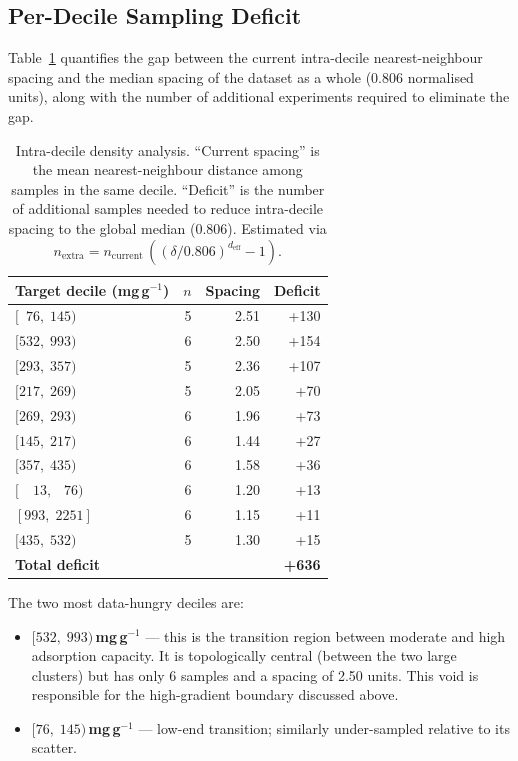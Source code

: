 \documentclass[12pt,a4paper]{article}
\begin{document}
\subsection{Per-Decile Sampling Deficit}

Table~\ref{tab:decile_deficit} quantifies the gap between the current
intra-decile nearest-neighbour spacing and the median spacing of the
dataset as a whole (0.806 normalised units), along with the number of
additional experiments required to eliminate the gap.

\begin{table}[h]
\centering
\caption{Intra-decile density analysis.  ``Current spacing'' is the mean
  nearest-neighbour distance among samples in the same decile.
  ``Deficit'' is the number of additional samples needed to reduce
  intra-decile spacing to the global median (0.806).
  Estimated via $n_\text{extra} = n_\text{current}\,((\delta/0.806)^{d_\text{eff}}-1)$.}
\label{tab:decile_deficit}
\small
\begin{tabular}{lrrr}
\toprule
Target decile (mg\,g$^{-1}$) & $n$ & Spacing & Deficit \\
\midrule
$[\phantom{0}76,\;145)$ & 5 & 2.51 & +130 \\
$[532,\;993)$           & 6 & 2.50 & +154 \\
$[293,\;357)$           & 5 & 2.36 & +107 \\
$[217,\;269)$           & 5 & 2.05 & +70  \\
$[269,\;293)$           & 6 & 1.96 & +73  \\
$[145,\;217)$           & 6 & 1.44 & +27  \\
$[357,\;435)$           & 6 & 1.58 & +36  \\
$[\phantom{00}13,\;\phantom{0}76)$ & 6 & 1.20 & +13  \\
$[993,\;2251]$          & 6 & 1.15 & +11  \\
$[435,\;532)$           & 5 & 1.30 & +15  \\
\midrule
\textbf{Total deficit}   & & & \textbf{+636} \\
\bottomrule
\end{tabular}
\end{table}

The two most data-hungry deciles are:
\begin{itemize}[leftmargin=*]
  \item \textbf{$[532,\;993)$\,mg\,g$^{-1}$} — this is the transition
        region between moderate and high adsorption capacity.  It is
        topologically central (between the two large clusters) but has
        only 6 samples and a spacing of 2.50 units.  This void is
        responsible for the high-gradient boundary discussed above.
  \item \textbf{$[76,\;145)$\,mg\,g$^{-1}$} — low-end transition;
        similarly under-sampled relative to its scatter.
\end{itemize}
\end{document}
